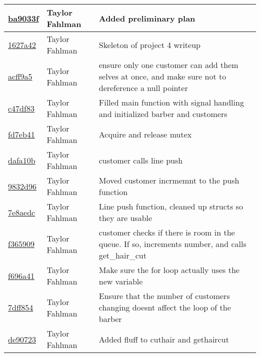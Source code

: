 \begin{tabular}{l l l}
\href{https://github.com/fahlmant/cs444/commit/ba9033f1dbf9b77b68eab8080d30be0844024607}{ba9033f} & Taylor Fahlman & Added preliminary plan\\\hline
\href{https://github.com/fahlmant/cs444/commit/1627a4248c49937b98d1170fd66da4c1edff7ffa}{1627a42} & Taylor Fahlman & Skeleton of project 4 writeup\\\hline
\href{https://github.com/fahlmant/cs444/commit/acff9a5dd3f37331941e738ed451fdea6d24898c}{acff9a5} & Taylor Fahlman & ensure only one customer can add them selves at once, and make sure not to dereference a null pointer\\\hline
\href{https://github.com/fahlmant/cs444/commit/c47df83c33858ae9f3209159dbb61fd03dfff50b}{c47df83} & Taylor Fahlman & Filled main function with signal handling and initialized barber and customers\\\hline
\href{https://github.com/fahlmant/cs444/commit/fd7eb4166f01deda12959c4d0c40fae1ae3b2ec3}{fd7eb41} & Taylor Fahlman & Acquire and release mutex\\\hline
\href{https://github.com/fahlmant/cs444/commit/dafa10b7238c79ecd900e8788a383271aa7af3bf}{dafa10b} & Taylor Fahlman & customer calls line push\\\hline
\href{https://github.com/fahlmant/cs444/commit/9832d96404a36e464718f1ede7c89eb6720c8d41}{9832d96} & Taylor Fahlman & Moved customer incrmemnt to the push function\\\hline
\href{https://github.com/fahlmant/cs444/commit/7e8aedcdf47eeb14060dd956bd51559cb1c3bd2c}{7e8aedc} & Taylor Fahlman & Line push function, cleaned up structs so they are usable\\\hline
\href{https://github.com/fahlmant/cs444/commit/f36590940927dc233ec5ceec23c002e4a8f09e20}{f365909} & Taylor Fahlman & customer checks if there is room in the queue. If so, increments number, and calls get_hair_cut\\\hline
\href{https://github.com/fahlmant/cs444/commit/f696a4130452abc0fbdd3dfc80abcbd2396ec7e8}{f696a41} & Taylor Fahlman & Make sure the for loop actually uses the new variable\\\hline
\href{https://github.com/fahlmant/cs444/commit/7dff854b73aa058e96e2c074ca081c0883eeed2d}{7dff854} & Taylor Fahlman & Ensure that the number of customers changing doesnt affect the loop of the barber\\\hline
\href{https://github.com/fahlmant/cs444/commit/de907234be86116ce95b1674d6a89515a34bc2ff}{de90723} & Taylor Fahlman & Added fluff to cuthair and gethaircut\\\hline

\end{tabular}
